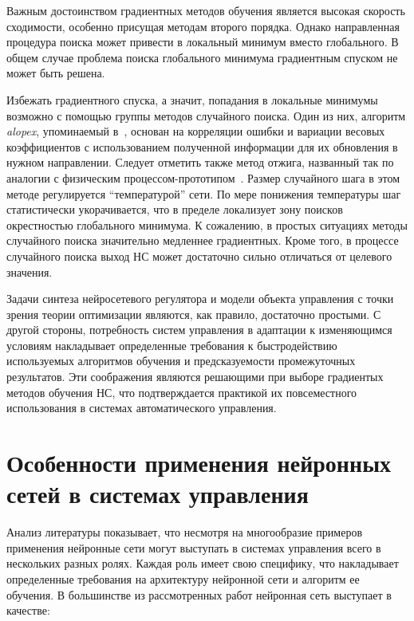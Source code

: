 Важным достоинством градиентных методов обучения является высокая
скорость сходимости, особенно присущая методам второго порядка.
Однако направленная процедура поиска может привести в локальный
минимум вместо глобального.  В общем случае проблема поиска
глобального минимума градиентным спуском не может быть решена.

Избежать градиентного спуска, а значит, попадания в локальные минимумы
возможно с помощью группы методов случайного поиска.  Один из них,
алгоритм {\it alopex}, упоминаемый в~\cite{boquete99}, основан на
корреляции ошибки и вариации весовых коэффициентов с использованием
полученной информации для их обновления в нужном направлении.  Следует
отметить также метод отжига, названный так по аналогии с физическим
процессом-прототипом~\cite{wasser92}.  Размер случайного шага в этом
методе регулируется ``температурой'' сети.  По мере понижения
температуры шаг статистически укорачивается, что в пределе локализует
зону поисков окрестностью глобального минимума.  К сожалению, в
простых ситуациях методы случайного поиска значительно медленнее
градиентных.  Кроме того, в процессе случайного поиска выход НС может
достаточно сильно отличаться от целевого значения.

Задачи синтеза нейросетевого регулятора и модели объекта управления с
точки зрения теории оптимизации являются, как правило, достаточно
простыми.  С другой стороны, потребность систем управления в адаптации
к изменяющимся условиям накладывает определенные требования к
быстродействию используемых алгоритмов обучения и предсказуемости
промежуточных результатов.  Эти соображения являются решающими при
выборе градиентых методов обучения НС, что подтверждается практикой их
повсеместного использования в системах автоматического управления.

\section{Особенности применения нейронных сетей в системах управления}

Анализ литературы показывает, что несмотря на многообразие примеров
применения нейронные сети могут выступать в системах управления всего
в нескольких разных ролях.  Каждая роль имеет свою специфику, что
накладывает определенные требования на архитектуру нейронной сети и
алгоритм ее обучения.  В большинстве из рассмотренных работ нейронная
сеть выступает в качестве:

